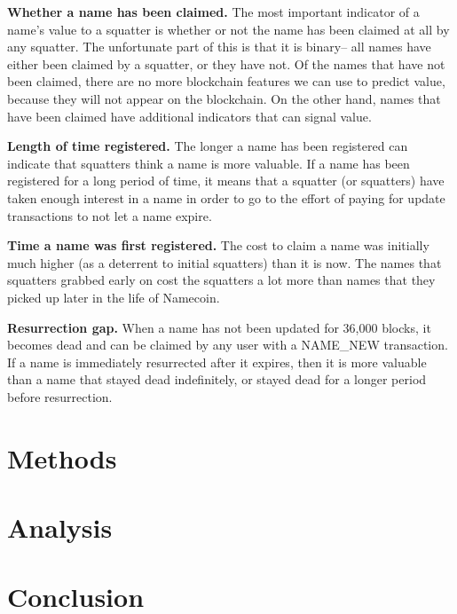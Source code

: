 \documentclass{article} %
\begin{document}
{\bf Whether a name has been claimed.} The most important indicator of a name's value to a squatter is whether or not the name has been claimed at all by any squatter. The unfortunate part of this is that it is binary-- all names have either been claimed by a squatter, or they have not. Of the names that have not been claimed, there are no more blockchain features we can use to predict value, because they will not appear on the blockchain. On the other hand, names that have been claimed have additional indicators that can signal value.

{\bf Length of time registered.} The longer a name has been registered can indicate that squatters think a name is more valuable. If a name has been registered for a long period of time, it means that a squatter (or squatters) have taken enough interest in a name in order to go to the effort of paying for update transactions to not let a name expire. 

{\bf Time a name was first registered.} The cost to claim a name was initially much higher (as a deterrent to initial squatters) than it is now. The names that squatters grabbed early on cost the squatters a lot more than names that they picked up later in the life of Namecoin. 

{\bf Resurrection gap.} When a name has not been updated for 36,000 blocks, it becomes dead and can be claimed by any user with a NAME\_NEW transaction. If a name is immediately resurrected after it expires, then it is more valuable than a name that stayed dead indefinitely, or stayed dead for a longer period before resurrection. 



\section{Methods}
 
\section{Analysis}


\section{Conclusion}

\newpage
\printbibliography
\end{document}
